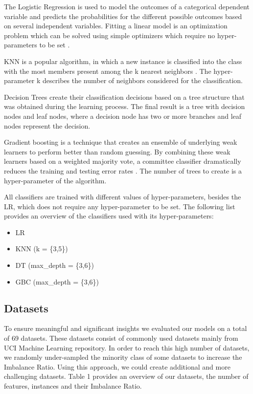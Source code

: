 \documentclass[parskip=full]{scrartcl}
\begin{document}
The Logistic Regression is used to model the outcomes of a categorical dependent
variable and predicts the probabilities for the different possible outcomes
based on several independent variables. Fitting a linear model is an
optimization problem which can be solved using simple optimizers which require
no hyper-parameters to be set \cite{McCullagh1984}.

KNN is a popular algorithm, in which a new instance is classified into the class
with the most members present among the k nearest neighbors \cite{Suguna2010}.
The hyper-parameter k describes the number of neighbors considered for the
classification.

Decision Trees create their classification decisions based on a tree structure
that was obtained during the learning process. The final result is a tree with
decision nodes and leaf nodes, where a decision node has two or more branches
and leaf nodes represent the decision.

Gradient boosting is a technique that creates an ensemble of underlying weak
learners to perform better than random guessing. By combining these weak
learners based on a weighted majority vote, a committee classifier dramatically
reduces the training and testing error rates  \cite{Huang2007}. The number of
trees to create is a hyper-parameter of the algorithm.

All classifiers are trained with different values of hyper-parameters, besides
the LR, which does not require any hyper-parameter to be set. The following list
provides an overview of the classifiers used with its hyper-parameters:

\begin{itemize}
  \item LR
  \item KNN (k = \{3,5\})
  \item DT (max\_depth = \{3,6\})
  \item GBC (max\_depth = \{3,6\})
\end{itemize}

\subsection{Datasets}

To ensure meaningful and significant insights we evaluated our models on a total
of 69 datasets. These datasets consist of commonly used datasets mainly from UCI
Machine Learning repository. In order to reach this high number of datasets, we
randomly under-sampled the minority class of some datasets to increase the
Imbalance Ratio. Using this approach, we could create additional and more
challenging datasets. Table 1 provides an overview of our datasets, the number
of features, instances and their Imbalance Ratio.
\end{document}
